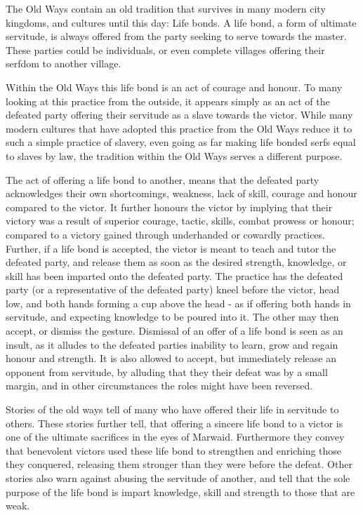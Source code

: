 The Old Ways contain an old tradition that survives in many modern city
kingdoms, and cultures until this day: Life bonds. A life bond, a form of
ultimate servitude, is always offered from the party seeking to serve towards
the master. These parties could be individuals, or even complete villages
offering their serfdom to another village.

Within the Old Ways this life bond is an act of courage and honour. To many
looking at this practice from the outside, it appears simply as an act of the
defeated party offering their servitude as a slave towards the victor. While
many modern cultures that have adopted this practice from the Old Ways reduce
it to such a simple practice of slavery, even going as far making life bonded
serfs equal to slaves by law, the tradition within the Old Ways serves a
different purpose.

The act of offering a life bond to another, means that the defeated party
acknowledges their own shortcomings, weakness, lack of skill, courage and
honour compared to the victor. It further honours the victor by implying that
their victory was a result of superior courage, tactic, skills, combat prowess
or honour; compared to a victory gained through underhanded or cowardly
practices. Further, if a life bond is accepted, the victor is meant to teach
and tutor the defeated party, and release them as soon as the desired
strength, knowledge, or skill has been imparted onto the defeated party. The
practice has the defeated party (or a representative of the defeated party)
kneel before the victor, head low, and both hands forming a cup above the head
- as if offering both hands in servitude, and expecting knowledge to be poured
into it. The other may then accept, or dismiss the gesture. Dismissal of an
offer of a life bond is seen as an insult, as it alludes to the defeated
parties inability to learn, grow and regain honour and strength. It is also
allowed to accept, but immediately release an opponent from servitude, by
alluding that they their defeat was by a small margin, and in other
circumstances the roles might have been reversed.

Stories of the old ways tell of many who have offered their life in servitude
to others. These stories further tell, that offering a sincere life bond to a
victor is one of the ultimate sacrifices in the eyes of Marwaid. Furthermore
they convey that benevolent victors used these life bond to strengthen
and enriching those they conquered, releasing them stronger than they were
before the defeat. Other stories also warn against abusing the servitude of
another, and tell that the sole purpose of the life bond is impart knowledge,
skill and strength to those that are weak.

